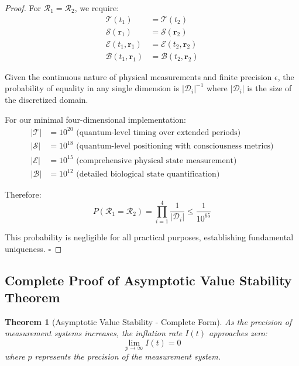 \documentclass[12pt,a4paper]{article}
\newtheorem{theorem}{Theorem}
\begin{document}
\begin{proof}
For $\mathcal{R}_1 = \mathcal{R}_2$, we require:
\begin{align}
\mathcal{T}(t_1) &= \mathcal{T}(t_2) \\
\mathcal{S}(\mathbf{r}_1) &= \mathcal{S}(\mathbf{r}_2) \\
\mathcal{E}(t_1, \mathbf{r}_1) &= \mathcal{E}(t_2, \mathbf{r}_2) \\
\mathcal{B}(t_1, \mathbf{r}_1) &= \mathcal{B}(t_2, \mathbf{r}_2)
\end{align}

Given the continuous nature of physical measurements and finite precision $\epsilon$, the probability of equality in any single dimension is $|\mathcal{D}_i|^{-1}$ where $|\mathcal{D}_i|$ is the size of the discretized domain.

For our minimal four-dimensional implementation:
\begin{align}
|\mathcal{T}| &= 10^{20} \text{ (quantum-level timing over extended periods)} \\
|\mathcal{S}| &= 10^{18} \text{ (quantum-level positioning with consciousness metrics)} \\
|\mathcal{E}| &= 10^{15} \text{ (comprehensive physical state measurement)} \\
|\mathcal{B}| &= 10^{12} \text{ (detailed biological state quantification)}
\end{align}

Therefore:
\begin{equation}
P(\mathcal{R}_1 = \mathcal{R}_2) = \prod_{i=1}^{4} \frac{1}{|\mathcal{D}_i|} \leq \frac{1}{10^{65}}
\end{equation}

This probability is negligible for all practical purposes, establishing fundamental uniqueness. $\square$
\end{proof}

\subsection{Complete Proof of Asymptotic Value Stability Theorem}

\begin{theorem}[Asymptotic Value Stability - Complete Form]
As the precision of measurement systems increases, the inflation rate $I(t)$ approaches zero:
\begin{equation}
\lim_{p \to \infty} I(t) = 0
\end{equation}
where $p$ represents the precision of the measurement system.
\end{theorem}
\end{document}

